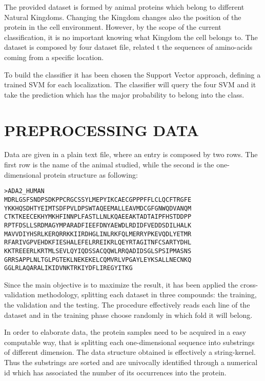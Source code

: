 \documentclass{acm_proc_article-sp-sigmod07}
\begin{document}
The provided  dataset is formed by animal proteins which belong to 
different Natural Kingdoms. Changing the Kingdom changes also the position
of the protein in the cell environment. However, by the scope of the current
classification, it is no important knowing what Kingdom the cell belongs to.
The dataset is composed by four dataset file, related t  the sequences of
amino-acids coming from a specific location.

To build the classifier it has been chosen the Support Vector approach, defining
a trained SVM for each localization. The classifier will query the four SVM and
it take the prediction which has the major probability to belong into the class.


\section{PREPROCESSING DATA}
Data are given in a plain text file, where an entry is composed by two rows.
The first row is the name of the animal studied, while the second is the
one-dimensional protein structure as following:

\begin{verbatim}
>ADA2_HUMAN
MDRLGSFSNDPSDKPPCRGCSSYLMEPYIKCAECGPPPFFLCLQCFTRGFE
YKKHQSDHTYEIMTSDFPVLDPSWTAQEEMALLEAVMDCGFGNWQDVANQM
CTKTKEECEKHYMKHFINNPLFASTLLNLKQAEEAKTADTAIPFHSTDDPP
RPTFDSLLSRDMAGYMPARADFIEEFDNYAEWDLRDIDFVEDDSDILHALK
MAVVDIYHSRLKERQRRKKIIRDHGLINLRKFQLMERRYPKEVQDLYETMR
RFARIVGPVEHDKFIESHALEFELRREIKRLQEYRTAGITNFCSARTYDHL
KKTREEERLKRTMLSEVLQYIQDSSACQQWLRRQADIDSGLSPSIPMASNS
GRRSAPPLNLTGLPGTEKLNEKEKELCQMVRLVPGAYLEYKSALLNECNKQ
GGLRLAQARALIKIDVNKTRKIYDFLIREGYITKG
\end{verbatim}

Since the main objective is to maximize the result, it has been applied the 
cross-validation methodology, splitting each dataset in three compounds: the
training, the validation and the testing. The procedure effectively reads each 
line of the dataset and in the training phase choose randomly in which fold it 
will belong.

In order to elaborate data, the protein samples need to be acquired in a easy 
computable way, that is splitting each one-dimensional sequence into substrings
of different dimension. The data structure obtained is effectively a 
string-kernel. Thus the substrings are sorted and are univocally 
identified through a numerical id which has associated the number of its 
occurrences into the protein.
\end{document}
